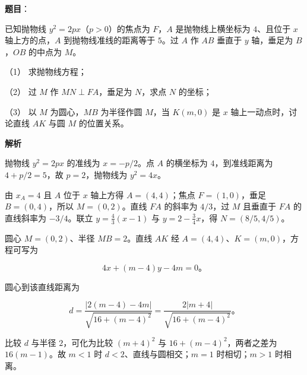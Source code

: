 \begin{answer}

\textbf{题目}：

已知抛物线 $y^2=2px$（$p>0$）的焦点为 $F$，$A$ 是抛物线上横坐标为 $4$、且位于 $x$ 轴上方的点，$A$ 到抛物线准线的距离等于 $5$。过 $A$ 作 $AB$ 垂直于 $y$ 轴，垂足为 $B$，$OB$ 的中点为 $M$。

（1） 求抛物线方程；

（2） 过 $M$ 作 $MN\perp FA$，垂足为 $N$，求点 $N$ 的坐标；

（3） 以 $M$ 为圆心，$MB$ 为半径作圆 $M$，当 $K(m,0)$ 是 $x$ 轴上一动点时，讨论直线 $AK$ 与圆 $M$ 的位置关系。
\nopagebreak[4]
\begin{center}\end{center}
\nopagebreak[4]
\textbf{解析}


抛物线 $y^2=2px$ 的准线为 $x=-p/2$。点 $A$ 的横坐标为 $4$，到准线距离为 $4+p/2=5$，故 $p=2$，抛物线为 $y^2=4x$。


由 $x_A=4$ 且 $A$ 位于 $x$ 轴上方得 $A=(4,4)$；焦点 $F=(1,0)$，垂足 $B=(0,4)$，所以 $M=(0,2)$。直线 $FA$ 的斜率为 $4/3$，过 $M$ 且垂直于 $FA$ 的直线斜率为 $-3/4$。联立 $y=\frac43(x-1)$ 与 $y=2-\frac34x$，得 $N=(8/5,4/5)$。


圆心 $M=(0,2)$、半径 $MB=2$。直线 $AK$ 经 $A=(4,4)$、$K=(m,0)$，方程可写为

\nopagebreak[4]
\[
4x+(m-4)y-4m=0\mbox{。}
\]

圆心到该直线距离为

\nopagebreak[4]
\[
d=\frac{|2(m-4)-4m|}{\sqrt{16+(m-4)^2}}
=\frac{2|m+4|}{\sqrt{16+(m-4)^2}}\mbox{。}
\]

比较 $d$ 与半径 $2$，可化为比较 $(m+4)^2$ 与 $16+(m-4)^2$，两者之差为 $16(m-1)$。故 $m<1$ 时 $d<2$、直线与圆相交；$m=1$ 时相切；$m>1$ 时相离。




\end{answer}
